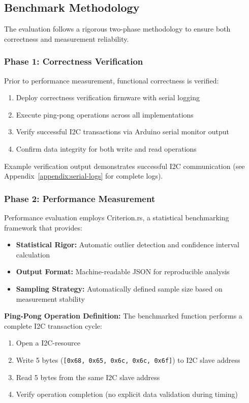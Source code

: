 \subsection{Benchmark Methodology}
\label{subsec:benchmark-methodology}

The evaluation follows a rigorous two-phase methodology to ensure both correctness and measurement reliability.

\subsubsection{Phase 1: Correctness Verification}
\label{subsubsec:correctness-verification}

Prior to performance measurement, functional correctness is verified:
\begin{enumerate}
    \item Deploy correctness verification firmware with serial logging
    \item Execute ping-pong operations across all implementations
    \item Verify successful I2C transactions via Arduino serial monitor output
    \item Confirm data integrity for both write and read operations
\end{enumerate}

Example verification output demonstrates successful I2C communication (see Appendix~\ref{appendix:serial-logs} for complete logs).

\subsubsection{Phase 2: Performance Measurement}
\label{subsubsec:performance-measurement}

Performance evaluation employs Criterion.rs, a statistical benchmarking framework that provides:
\begin{itemize}
    \item \textbf{Statistical Rigor:} Automatic outlier detection and confidence interval calculation
    \item \textbf{Output Format:} Machine-readable JSON for reproducible analysis
    \item \textbf{Sampling Strategy:} Automatically defined sample size based on measurement stability
\end{itemize}

\textbf{Ping-Pong Operation Definition:}
The benchmarked function performs a complete I2C transaction cycle:
\begin{enumerate}
    \item Open a I2C-resource
    \item Write 5 bytes (\texttt{[0x68, 0x65, 0x6c, 0x6c, 0x6f]}) to I2C slave address
    \item Read 5 bytes from the same I2C slave address
    \item Verify operation completion (no explicit data validation during timing)
\end{enumerate}

